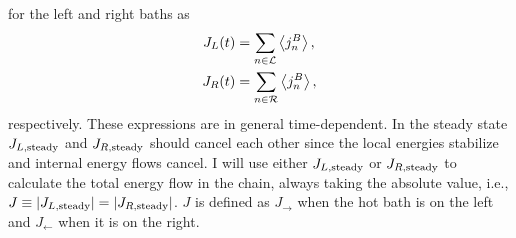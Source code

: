 for the left and right baths as
%
\begin{align}
  J_L (t)&= \sum_{n\in {\cal L}} \expval{j^B_n},\nonumber\\
  J_R (t)&= \sum_{n\in {\cal R}} \expval{j^B_n},
  \label{eq:chapter5_BathHeatFlows}
\end{align}
%
respectively. These expressions are in general time-dependent. In the steady state $J_{L,{\rm steady}}$ and $J_{R,{\rm steady}}$ should cancel each other since the local energies stabilize and internal energy flows cancel. I will use either $J_{L,{\rm steady}}$ or $J_{R,{\rm steady}}$ to calculate the total energy flow in the chain, always taking the absolute value, i.e., $J \equiv \abs{J_{L,{\rm steady}}}= \abs{J_{R,{\rm steady}}}$. $J$ is defined as $J_\rightarrow$ when the hot bath is on the left
and $J_\leftarrow$ when it is on the right.

